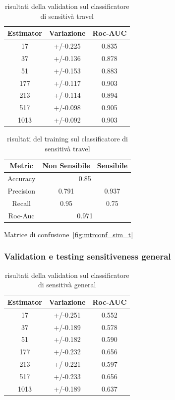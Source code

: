 \begin{table}[h]
\label{tbl:val_sens_travel}
\centering
\begin{tabular}{|c|c|c|}
\hline
\textbf{Estimator} & \textbf{Variazione} & \textbf{Roc-AUC} \\ \hline
17 & +/-0.225 & 0.835 \\ \hline
37 & +/-0.136 & 0.878 \\ \hline
51 & +/-0.153 & 0.883 \\ \hline
177 & +/-0.117 & 0.903 \\ \hline
213 & +/-0.114 & 0.894 \\ \hline
517 & +/-0.098 & 0.905 \\ \hline
1013 & +/-0.092 & 0.903 \\ \hline
\end{tabular}
\caption{risultati della validation sul classificatore di sensitivà travel}
\end{table}
\FloatBarrier

\begin{table}[h]
\label{tbl:training_sens_travel}
\centering
\begin{tabular}{|c|c|c|}
\hline
\textbf{Metric} & \textbf{Non Sensibile} & \textbf{Sensibile} \\ \hline
Accuracy & \multicolumn{2}{c|}{0.85} \\ \hline
Precision & 0.791 & 0.937 \\ \hline
Recall & 0.95 & 0.75 \\ \hline
Roc-Auc & \multicolumn{2}{c|}{0.971} \\ \hline
\end{tabular}
\caption{risultati del training sul classificatore di sensitivà travel}
\end{table}
\FloatBarrier

Matrice di confusione~\ref{fig:mtrconf_sim_t}

\subsubsection{Validation e testing sensitiveness general}
\label{sssec:val_testing_general}

\begin{table}[h]
\label{tbl:val_sens_general}
\centering
\begin{tabular}{|c|c|c|}
\hline
\textbf{Estimator} & \textbf{Variazione} & \textbf{Roc-AUC} \\ \hline
17 & +/-0.251 & 0.552 \\ \hline
37 & +/-0.189 & 0.578 \\ \hline
51 & +/-0.182 & 0.590 \\ \hline
177 & +/-0.232 & 0.656 \\ \hline
213 & +/-0.221 & 0.597 \\ \hline
517 & +/-0.233 & 0.656 \\ \hline
1013 & +/-0.189 & 0.637 \\ \hline
\end{tabular}
\caption{risultati della validation sul classificatore di sensitivà general}
\end{table}
\FloatBarrier

